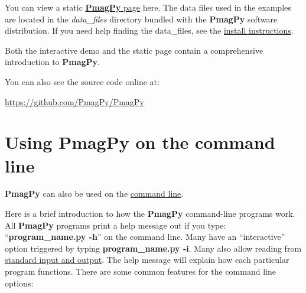 \documentclass[11pt]{book}
\begin{document}
{{You can view a static \href{https://pmagpy.github.io/PmagPy_introduction.html}{{\bf PmagPy} page} here.  The data files used in the examples are located in the {\it data\_files} directory bundled with the {\bf PmagPy} software distribution.  If you need help finding the data\_files, see the \href{#getting_python}{install instructions}.

Both the interactive demo and the static page contain a comprehensive introduction to {\bf PmagPy}.

You can also see the source code online at:


 \url{https://github.com/PmagPy/PmagPy}



\section{Using PmagPy on the command line}

{\bf PmagPy}  can also be used on the \href{#command_line}{command line}.

Here is a brief introduction to how the {\bf PmagPy} command-line programs work.  All {\bf PmagPy} programs print a help message out if you type: ``{\bf program\_name.py -h}'' on the command line.  Many have an ``interactive'' option triggered by typing {\bf program\_name.py -i}.  Many also allow reading from \href{#standard_IO }{standard input and output}.   The help message will explain how each particular program functions.  There are some common features for the command line options:


}}
\end{document}
